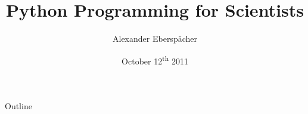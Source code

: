 \documentclass[compress]{beamer}
\title[] %
{Python Programming for Scientists}
\author[] %
{Alexander Eberspächer}
\date[]{October 12\textsuperscript{th} 2011} %
\begin{document}
\begin{frame} %
  \titlepage
  \thispagestyle{empty}
\end{frame}

\begin{frame}{Outline} %
  \tableofcontents
\end{frame}






\end{document}
